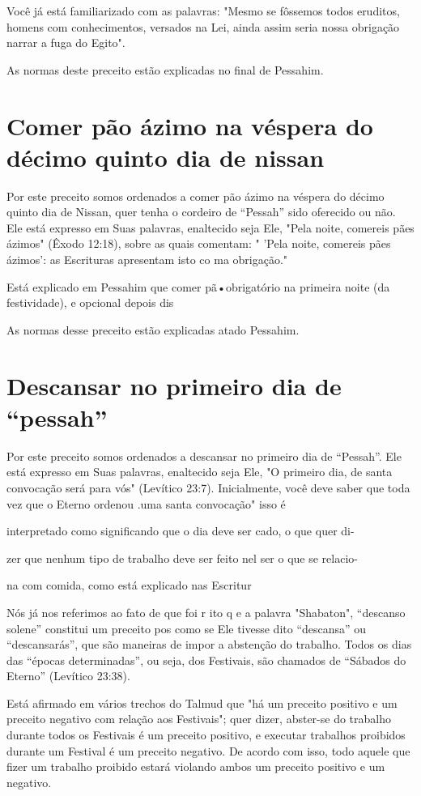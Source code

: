 Você já está familiarizado com as palavras: "Mesmo se fôssemos to­dos
eruditos, homens com conhecimentos, versados na Lei, ainda assim seria
nossa obrigação narrar a fuga do Egito".


As normas deste preceito estão explicadas no final de Pessahim.


\section{Comer pão ázimo na véspera do décimo quinto dia de nissan}

Por este preceito somos ordenados a comer pão ázimo na véspera do décimo
quinto dia de Nissan, quer tenha o cordeiro de ``Pessah'' sido oferecido ou não. Ele está expresso em Suas palavras, enaltecido seja Ele,
"Pela noi­te, comereis pães ázimos" (Êxodo 12:18), sobre as quais
comentam: " 'Pela noite, comereis pães ázimos': as Escrituras apresentam
isto co ma obrigação."

Está explicado em Pessahim que comer pã•obrigatório na primeira noite
(da festividade), e opcional depois dis

As normas desse preceito estão explicadas atado Pessahim.

\section{Descansar no primeiro dia de ``pessah''}

Por este preceito somos ordenados a descansar no primeiro dia de
``Pessah''. Ele está expresso em Suas palavras, enaltecido seja Ele, "O
primeiro dia, de santa convocação será para vós" (Levítico 23:7).
Inicialmente, você de­ve saber que toda vez que o Eterno ordenou
.uma santa convocação" isso é

interpretado como significando que o dia deve ser cado, o que quer di-

zer que nenhum tipo de trabalho deve ser feito nel ser o que se relacio-

na com comida, como está explicado nas Escritur

Nós já nos referimos ao fato de que foi r ito q e a palavra "Shaba­ton",
``descanso solene'' constitui um preceito pos como se Ele tivesse dito
``descansa'' ou ``descansarás'', que são maneiras de impor a abstenção do
trabalho. Todos os dias das ``épocas determinadas'', ou seja, dos
Festivais, são chamados de ``Sábados do Eterno'' (Levítico 23:38).

Está afirmado em vários trechos do Talmud que "há um preceito po­sitivo
e um preceito negativo com relação aos Festivais"; quer dizer, abster-se
do trabalho durante todos os Festivais é um preceito positivo, e
executar traba­lhos proibidos durante um Festival é um preceito
negativo. De acordo com is­so, todo aquele que fizer um trabalho
proibido estará violando ambos um pre­ceito positivo e um negativo.

